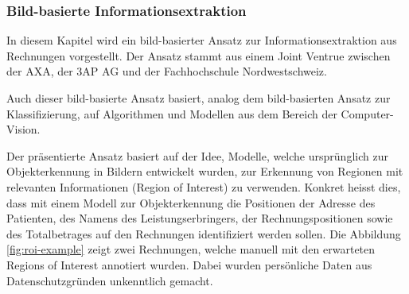 \subsubsection{Bild-basierte Informationsextraktion}

In diesem Kapitel wird ein bild-basierter Ansatz zur Informationsextraktion aus Rechnungen vorgestellt. Der Ansatz stammt aus einem Joint Ventrue zwischen der AXA, der 3AP AG und der Fachhochschule Nordwestschweiz. 

Auch dieser bild-basierte Ansatz basiert, analog dem bild-basierten Ansatz zur Klassifizierung, auf Algorithmen und Modellen aus dem Bereich der Computer-Vision.

Der präsentierte Ansatz basiert auf der Idee, Modelle, welche ursprünglich zur Objekterkennung in Bildern entwickelt wurden, zur Erkennung von Regionen mit relevanten Informationen (Region of Interest) zu verwenden. Konkret heisst dies, dass mit einem Modell zur Objekterkennung die Positionen der Adresse des Patienten, des Namens des Leistungserbringers, der Rechnungspositionen sowie des Totalbetrages auf den Rechnungen identifiziert werden sollen. Die Abbildung \ref{fig:roi-example} zeigt zwei Rechnungen, welche manuell mit den erwarteten Regions of Interest annotiert wurden. Dabei wurden persönliche Daten aus Datenschutzgründen unkenntlich gemacht.

